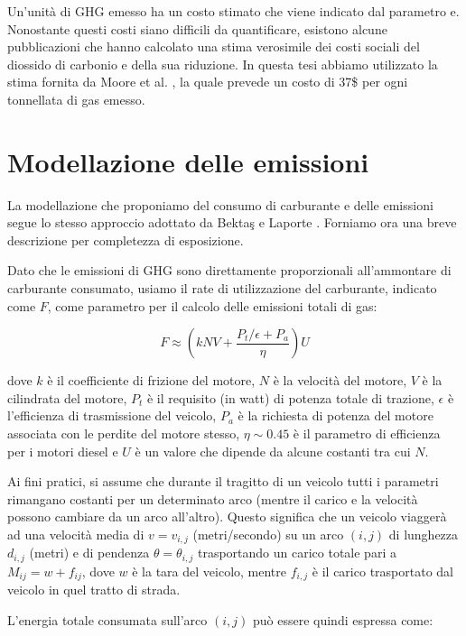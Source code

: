 	Un’unità di GHG emesso ha un costo stimato che viene indicato dal parametro e. Nonostante questi costi siano difficili da quantificare, esistono alcune pubblicazioni che hanno calcolato una stima verosimile dei costi sociali del diossido di carbonio e della sua riduzione. In questa tesi abbiamo utilizzato la stima fornita da Moore et al. \cite{moore2015temperature}, la quale prevede un costo di 37\$ per ogni tonnellata di gas emesso.

\section{Modellazione delle emissioni} %
\label{sec:modellazione_emissioni}
	La modellazione che proponiamo del consumo di carburante e delle emissioni segue lo stesso approccio adottato da Bektaş e Laporte \cite{Laporte11}. Forniamo ora una breve descrizione per completezza di esposizione.

	Dato che le emissioni di GHG sono direttamente proporzionali all’ammontare di carburante consumato, usiamo il rate di utilizzazione del carburante, indicato come $F$, come parametro per il calcolo delle emissioni totali di gas:

	\begin{equation}
		\label{eq:fuel_consumption}
		F \approx \left( kNV + \frac{P_t \slash \epsilon + P_a}{\eta} \right) U
	\end{equation}

	dove $k$ è il coefficiente di frizione del motore, $N$ è la velocità del motore, $V$ è la cilindrata del motore, $P_{t}$ è il requisito (in watt) di potenza totale di trazione, $\epsilon$ è l'efficienza di trasmissione del veicolo, $P_{a}$ è la richiesta di potenza del motore associata con le perdite del motore stesso, $\eta \sim 0.45$ è il parametro di efficienza per i motori diesel e $U$ è un valore che dipende da alcune costanti tra cui $N$.

	Ai fini pratici, si assume che durante il tragitto di un veicolo tutti i parametri rimangano costanti per un determinato arco (mentre il carico e la velocità possono cambiare da un arco all’altro). Questo significa che un veicolo viaggerà ad una velocità media di $v=v_{i,j}$ (metri/secondo) su un arco $(i,j)$ di lunghezza $d_{i,j}$ (metri) e di pendenza $\theta = \theta_{i,j}$ trasportando un carico totale pari a $M_{ij} = w + f_{ij}$, dove $w$ è la tara del veicolo, mentre $f_{i,j}$ è il carico trasportato dal veicolo in quel tratto di strada.

	L’energia totale consumata sull’arco $(i,j)$ può essere quindi espressa come:

